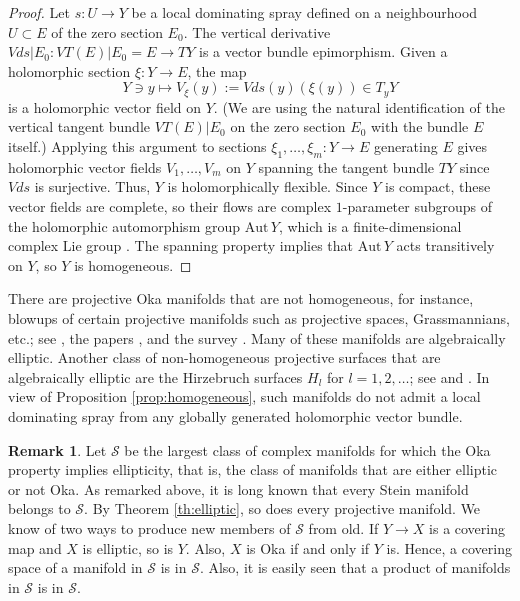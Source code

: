 \documentclass[12pt]{amsart}
\theoremstyle{definition}
\newtheorem{remark}[theorem]{Remark}
\numberwithin{equation}{section}
\numberwithin{figure}{section}
\newcommand\Aut{\mathrm{Aut}}
\numberwithin{equation}{section}
\begin{document}
\begin{proof}
Let $s:U\to Y$ be a local dominating spray defined on a
neighbourhood $U\subset E$ of the zero section $E_0$. 
The vertical derivative $V\!ds|E_0: VT(E)|E_0= E \to TY$ 
is a vector bundle epimorphism. 
Given a holomorphic section $\xi : Y\to E$, the map  
\[
	Y\ni y \longmapsto V_\xi(y) := V\!ds(y)(\xi(y)) \in T_yY
\]
is a holomorphic vector field on $Y$. 
(We are using the natural identification of the vertical tangent
bundle $VT(E)|E_0$ on the zero section $E_0$ with the bundle $E$ itself.)
Applying this argument to sections $\xi_1,\ldots,\xi_m:Y\to E$
generating $E$ gives holomorphic vector fields 
$V_1,\ldots,V_m$ on $Y$ spanning the tangent 
bundle $TY$ since $V\!ds$ is surjective. 
Thus, $Y$ is holomorphically flexible.
Since $Y$ is compact, these vector fields are complete, so 
their flows are complex $1$-parameter subgroups of the holomorphic automorphism group $\Aut\,Y$, which is a finite-dimensional complex 
Lie group \cite{BochnerMontgomery1947-2}.
The spanning property implies that $\Aut\,Y$ acts transitively on $Y$,
so $Y$ is homogeneous.
\end{proof}

There are projective Oka manifolds that are not homogeneous, 
for instance, blowups of certain projective manifolds such as projective spaces, 
Grassmannians, etc.; see \cite[Propositions 6.4.5 and 6.4.6]{Forstneric2017E}, 
the papers \cite{KalimanKutzschebauchTruong2018,LarussonTruong2017},
and the survey \cite[Subsect.\ 6.3]{Forstneric2023Indag}.
Many of these manifolds are algebraically elliptic.
Another class of non-homogeneous projective surfaces that 
are algebraically elliptic are the Hirzebruch surfaces $H_l$ for $l=1,2,\ldots$; 
see \cite[p.\ 191]{BarthHulek2004} and 
\cite[Proposition 6.4.5]{Forstneric2017E}. 
In view of Proposition \ref{prop:homogeneous}, 
such manifolds do not admit a local dominating spray 
from any globally generated holomorphic vector bundle.


\begin{remark}
Let $\mathscr S$ be the largest class of complex manifolds for which 
the Oka property implies ellipticity, that is, the class of manifolds that are 
either elliptic or not Oka.  As remarked above, it is long known that every 
Stein manifold belongs to $\mathscr S$.  By Theorem \ref{th:elliptic}, so 
does every projective manifold.  We know of two ways to produce new 
members of $\mathscr S$ from old.  If $Y\to X$ is a covering map and $X$ is elliptic, so is $Y$. Also, $X$ is Oka if and only if $Y$ is.  Hence, a covering space of a manifold in $\mathscr S$ is in $\mathscr S$.  Also, it is easily seen that a product of manifolds in $\mathscr S$ is in $\mathscr S$.
\end{remark}
\end{document}
